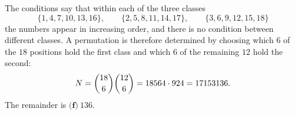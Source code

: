 The conditions say that within each of the three classes
\[
\{1,4,7,10,13,16\},\qquad\{2,5,8,11,14,17\},\qquad\{3,6,9,12,15,18\}
\]
the numbers appear in increasing order, and there is no condition between different classes. A permutation is therefore determined by choosing which $6$ of the $18$ positions hold the first class and which $6$ of the remaining $12$ hold the second:
\[
N=\dbinom{18}{6}\dbinom{12}{6}=18564\cdot924=17153136 .
\]
The remainder is $\boxed{\textbf{(f)}\ 136}$.
